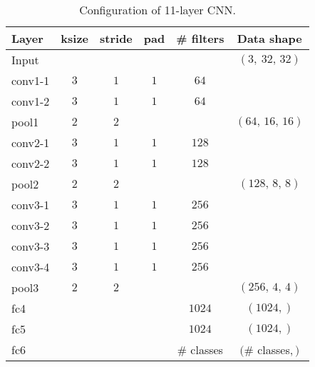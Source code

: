 \documentclass[10pt,twocolumn,letterpaper]{article}
\begin{document}
\begin{table}[h]
	\centering
	\vspace{2mm}
	\caption{Configuration of 11-layer CNN.}
	\label{tab:cnn}
	\vspace{2mm}
	\small
	\begin{tabular}{lccccc}
		\toprule
		Layer  & ksize & stride & pad &\# filters & Data shape \\
		\midrule
		Input  & & & & & $(3,\ 32,\,32)$ \\
		\midrule
		conv1-1 & $3$ & $1$ &$1$ & $64$ & \\
		conv1-2 & $3$ & $1$ &$1$ & $64$ \\
		pool1  & $2$ & $2$ & & & $(64,\, 16,\, 16)$\\
		\midrule
		conv2-1 & $3$ & $1$ &$1$ & $128$ & \\
		conv2-2 & $3$ & $1$ &$1$ & $128$ \\
		pool2  & $2$ & $2$ & & & $(128,\, 8,\, 8)$\\
		\midrule
		conv3-1 & $3$ & $1$ &$1$ & $256$ & \\
		conv3-2 & $3$ & $1$ &$1$ & $256$ \\
		conv3-3 & $3$ & $1$ &$1$ & $256$ & \\
		conv3-4 & $3$ & $1$ &$1$ & $256$ \\
		pool3  & $2$ & $2$ & & & $(256,\, 4,\, 4)$\\
		\midrule
		fc4 & & & & $1024$ & $(1024,)$ \\
		fc5 & & & & $1024$ & $(1024,)$ \\
		fc6 & & & & \# classes & $($\# classes$,)$ \\
		\bottomrule
	\end{tabular}
\end{table}
\end{document}
